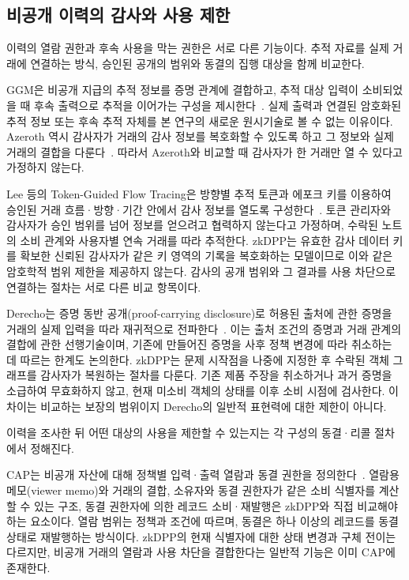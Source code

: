 \subsection{비공개 이력의 감사와 사용 제한}

이력의 열람 권한과 후속 사용을 막는 권한은 서로 다른 기능이다.
추적 자료를 실제 거래에 연결하는 방식, 승인된 공개의 범위와
동결의 집행 대상을 함께 비교한다.

GGM은 비공개 지급의 추적 정보를 증명 관계에 결합하고, 추적 대상
입력이 소비되었을 때 후속 출력으로 추적을 이어가는 구성을
제시한다~\cite{garman-accountable-privacy-2017}. 실제 출력과 연결된
암호화된 추적 정보 또는 후속 추적 자체를 본 연구의 새로운 원시기술로
볼 수 없는 이유이다. Azeroth 역시 감사자가 거래의 감사 정보를
복호화할 수 있도록 하고 그 정보와 실제 거래의 결합을
다룬다~\cite{jeong-azeroth-2023}. 따라서 Azeroth와 비교할 때 감사자가 한 거래만
열 수 있다고 가정하지 않는다.

Lee 등의 Token-Guided Flow Tracing은 방향별 추적 토큰과 에포크
키를 이용하여 승인된 거래 흐름·방향·기간 안에서 감사 정보를
열도록 구성한다~\cite{lee-token-guided-2026}. 토큰 관리자와
감사자가 승인 범위를 넘어 정보를 얻으려고 협력하지 않는다고 가정하며, 수락된 노트의 소비 관계와
사용자별 연속 거래를 따라 추적한다. zkDPP는 유효한 감사 데이터
키를 확보한 신뢰된 감사자가 같은 키 영역의 기록을 복호화하는
모델이므로 이와 같은 암호학적 범위 제한을 제공하지 않는다.
감사의 공개 범위와 그 결과를 사용 차단으로 연결하는 절차는
서로 다른 비교 항목이다.

Derecho는 증명 동반 공개(proof-carrying disclosure)로 허용된 출처에 관한 증명을
거래의 실제 입력을 따라 재귀적으로 전파한다~\cite{beal-derecho-2023}.
이는 출처 조건의 증명과 거래 관계의 결합에 관한 선행기술이며,
기존에 만들어진 증명을 사후 정책 변경에 따라 취소하는 데 따르는
한계도 논의한다. zkDPP는 문제 시작점을 나중에 지정한 후 수락된
객체 그래프를 감사자가 복원하는 절차를 다룬다. 기존 제품 주장을 취소하거나
과거 증명을 소급하여 무효화하지 않고, 현재 미소비 객체의 상태를
이후 소비 시점에 검사한다. 이 차이는 비교하는 보장의 범위이지
Derecho의 일반적 표현력에 대한 제한이 아니다.

이력을 조사한 뒤 어떤 대상의 사용을 제한할 수 있는지는
각 구성의 동결·리콜 절차에서 정해진다.

CAP는 비공개 자산에 대해 정책별 입력·출력 열람과 동결 권한을
정의한다~\cite{espresso-cap-spec-2022}. 열람용 메모(viewer memo)와 거래의 결합,
소유자와 동결 권한자가 같은 소비 식별자를 계산할 수 있는 구조,
동결 권한자에 의한 레코드 소비·재발행은 zkDPP와 직접 비교해야 하는
요소이다. 열람 범위는 정책과 조건에 따르며, 동결은 하나 이상의
레코드를 동결 상태로 재발행하는 방식이다. zkDPP의 현재 식별자에
대한 상태 변경과 구체 전이는 다르지만, 비공개 거래의 열람과 사용
차단을 결합한다는 일반적 기능은 이미 CAP에 존재한다.

